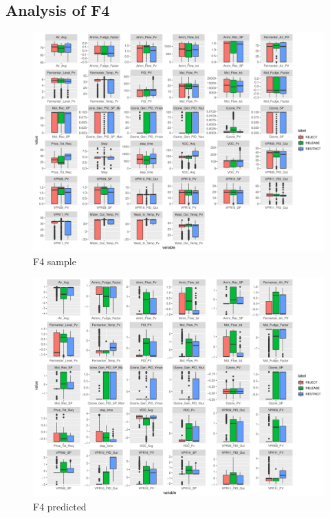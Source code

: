 \subsection{Analysis of F4}
\begin{figure}
    \centering
    \includegraphics[width=1.0\textwidth]{plots/f4-sample.pdf}
    \caption{F4 sample}
    \label{fig:f4_sample}
\end{figure}

\begin{figure}
    \centering
    \includegraphics[width=1.0\textwidth]{plots/f4-predicted.pdf}
    \caption{F4 predicted}
    \label{fig:f4_predicted}
\end{figure}

